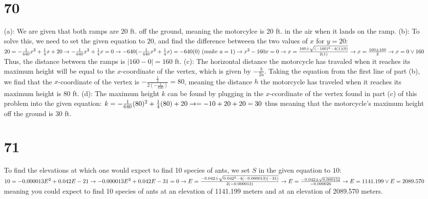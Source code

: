 \documentclass{article}
\theoremstyle{definition}
\begin{document}
\section*{70}
(a): We are given that both ramps are 20 ft. off the ground, meaning the motorcylce is 20 ft. in the air when it lands on the ramp.\newline 
(b): To solve this, we need to set the given equation to $20$, and find the difference betweeen the two values of $x$ for $y=20$:\newline 
$20=-\frac{1}{640}x^2+\frac{1}{4}x+20\newline\rightarrow 
-\frac{1}{640}x^2+\frac{1}{4}x=0\newline\rightarrow 
-640(-\frac{1}{640}x^2+\frac{1}{4}x)=-640(0)\ (make\ a=1)\newline\rightarrow 
x^2-160x=0\newline\rightarrow 
x=\frac{160\pm\sqrt{(-160)^2-4(1)(0)}}{2(1)}\newline\rightarrow 
x=\frac{160\pm 160}{2}\newline\rightarrow 
x=0\vee 160$\newline Thus, the distance between the ramps is $|160-0|=160$ ft.\newline
(c): The horizontal distance the motorcycle has travaled when it reaches its maximum height will be equal to the $x$-coordinate of the vertex, 
which is given by $-\frac{b}{2a}$. Taking the equation from the first line of part (b), we find that the $x$-coordinate of the vertex is 
$-\frac{\frac{1}{4}}{2(-\frac{1}{640})}=80$, meaning the distance $h$ the motorcycle has traveled when it reaches its maximum height is $80$ ft.\newline 
(d): The maximum height $k$ can be found by plugging in the $x$-ccordinate of the vertex found in part (c) of this problem into the given equation:
\newline $k=-\frac{1}{640}(80)^2+\frac{1}{4}(80)+20\newline\rightarrow 
=-10+20+20=30$\newline 
thus meaning that the motorcycle's maximum height off the ground is $30$ ft.

\section*{71}
To find the elevations at which one would expect to find 10 species of ants, we set $S$ in the given equation to $10$:\newline 
$10=-0.000013E^2+0.042E-21\newline\rightarrow 
-0.000013E^2+0.042E-31=0\newline\rightarrow 
E=\frac{-0.042\pm\sqrt{0.042^2-4(-0.000013)(-31)}}{2(-0.000013)}\newline\rightarrow 
E=\frac{-0.042\pm\sqrt{0.000152}}{-0.000026}\newline\rightarrow 
E=1141.199\vee E=2089.570$\meaning meaning you could expect to find 10 species of ants at an elevation of 1141.199 meters and at an elevation of 
2089.570 meters.
\end{document}
